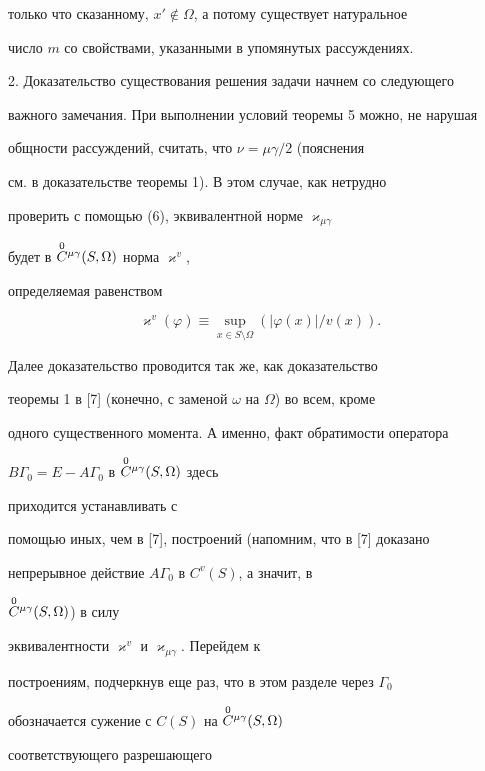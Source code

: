 только что сказанному, $x'\notin\Omega$, а потому существует натуральное 


число $m$ со свойствами, указанными в упомянутых рассуждениях. 


\medskip 


 


2. Доказательство существования решения задачи начнем со следующего 


важного замечания. При выполнении условий теоремы 5 можно, не нарушая 


общности рассуждений, считать, что $\nu=\mu\gamma/2$ (пояснения 


см. в доказательстве теоремы 1). В этом случае, как нетрудно 


проверить с помощью (6), эквивалентной норме $\varkappa_{\mu\gamma}$


будет в $\overset{0}{C}{}^{\mu\gamma}(S,\Omega)$ норма $\varkappa^v$,


определяемая равенством 


$$ 


\varkappa^v(\varphi)\equiv\sup_{x\in S\setminus\Omega} 


(|\varphi(x)|/v(x)). 


$$ 


 


Далее доказательство проводится так же, как доказательство 


теоремы 1 в [7] (конечно, с заменой $\omega$ на $\Omega$) во всем, кроме 


одного существенного момента. А именно, факт обратимости оператора 


$B\Gamma_0=E-A\Gamma_0$ в $\overset{0}{C}{}^{\mu\gamma}(S,\Omega)$ здесь 


приходится устанавливать с 


помощью иных, чем в [7], построений (напомним, что в [7] доказано 


непрерывное действие $A\Gamma_0$ в $C^v(S)$, а значит, в 


$\overset{0}{C}{}^{\mu\gamma}(S,\Omega)$) в силу 


эквивалентности $\varkappa^v$ и $\varkappa_{\mu\gamma}$. Перейдем к 


построениям, подчеркнув еще раз, что в этом разделе через $\Gamma_0$ 


обозначается сужение с $C(S)$ на $\overset{0}{C}{}^{\mu\gamma}(S,\Omega)$ 


соответствующего разрешающего 


